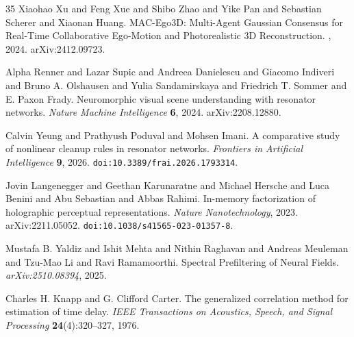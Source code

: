 \documentclass[11pt]{article}
\begin{document}
\begin{thebibliography}{35}
Xiaohao Xu and Feng Xue and Shibo Zhao and Yike Pan and Sebastian
Scherer and Xiaonan Huang.
\newblock MAC-Ego3D: Multi-Agent Gaussian Consensus for Real-Time
Collaborative Ego-Motion and Photorealistic 3D Reconstruction.
, 2024.
\newblock arXiv:2412.09723.

Alpha Renner and Lazar Supic and Andreea Danielescu and Giacomo Indiveri
and Bruno A. Olshausen and Yulia Sandamirskaya and Friedrich T. Sommer
and E. Paxon Frady.
\newblock Neuromorphic visual scene understanding with resonator
networks.
\newblock \emph{Nature Machine Intelligence} \textbf{6}, 2024.
\newblock arXiv:2208.12880.

Calvin Yeung and Prathyush Poduval and Mohsen Imani.
\newblock A comparative study of nonlinear cleanup rules in resonator
networks.
\newblock \emph{Frontiers in Artificial Intelligence} \textbf{9}, 2026.
\newblock \texttt{doi:10.3389/frai.2026.1793314}.

Jovin Langenegger and Geethan Karunaratne and Michael Hersche and Luca
Benini and Abu Sebastian and Abbas Rahimi.
\newblock In-memory factorization of holographic perceptual
representations.
\newblock \emph{Nature Nanotechnology}, 2023.
\newblock arXiv:2211.05052.
\newblock \texttt{doi:10.1038/s41565-023-01357-8}.

Mustafa B. Yaldiz and Ishit Mehta and Nithin Raghavan and Andreas
Meuleman and Tzu-Mao Li and Ravi Ramamoorthi.
\newblock Spectral Prefiltering of Neural Fields.
\newblock \emph{arXiv:2510.08394}, 2025.

Charles H. Knapp and G. Clifford Carter.
\newblock The generalized correlation method for estimation of time
delay.
\newblock \emph{IEEE Transactions on Acoustics, Speech, and Signal
Processing} \textbf{24}(4):320--327, 1976.

\end{thebibliography}
\end{document}
